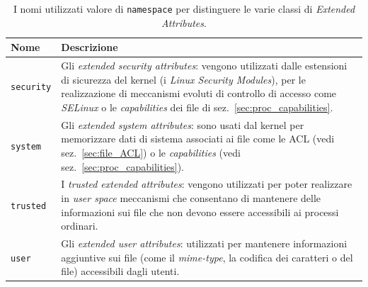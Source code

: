 \begin{table}[htb]
  \centering
  \footnotesize
  \begin{tabular}{|l|p{8cm}|}
    \hline
    \textbf{Nome} & \textbf{Descrizione} \\
    \hline
    \hline
    \texttt{security}&Gli \textit{extended security attributes}: vengono
                      utilizzati dalle estensioni di sicurezza del kernel (i
                      \textit{Linux Security Modules}), per le realizzazione
                      di meccanismi evoluti di controllo di accesso come
                      \textit{SELinux} o le \textit{capabilities} dei
                      file di sez.~\ref{sec:proc_capabilities}.\\ 
    \texttt{system} & Gli \textit{extended system attributes}: sono usati
                      dal kernel per memorizzare dati di sistema associati ai
                      file come le ACL (vedi sez.~\ref{sec:file_ACL}) o le
                      \textit{capabilities} (vedi
                      sez.~\ref{sec:proc_capabilities}).\\
    \texttt{trusted}& I \textit{trusted extended attributes}: vengono
                      utilizzati per poter realizzare in \textit{user space} 
                      meccanismi che consentano di mantenere delle
                      informazioni sui file che non devono essere accessibili
                      ai processi ordinari.\\
    \texttt{user}   & Gli \textit{extended user attributes}: utilizzati per
                      mantenere informazioni aggiuntive sui file (come il
                      \textit{mime-type}, la codifica dei caratteri o del
                      file) accessibili dagli utenti.\\
    \hline
  \end{tabular}
  \caption{I nomi utilizzati valore di \texttt{namespace} per distinguere le
    varie classi di \textit{Extended Attributes}.}
  \label{tab:extended_attribute_class}
\end{table}


